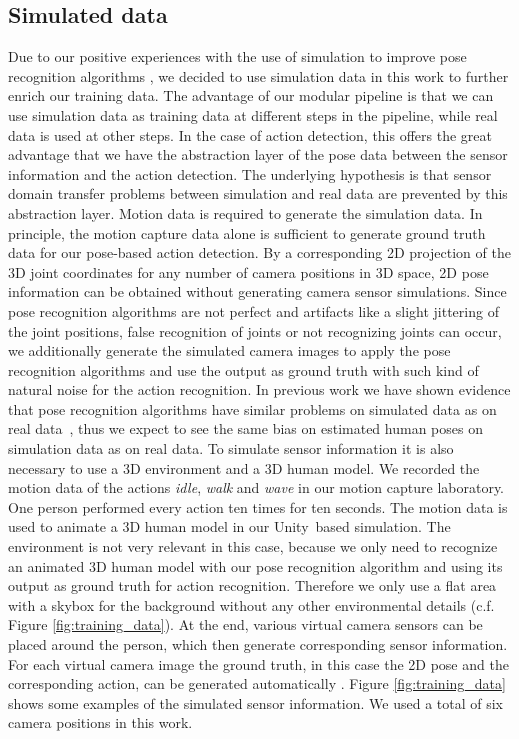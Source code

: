 \documentclass[a4paper, 10pt, conference]{ieeeconf}
\begin{document}
\subsection{Simulated data}
\label{sec:train_simulated}
Due to our positive experiences with the use of simulation to improve pose recognition algorithms \cite{ludlUsingSimulationImprove2018}, we decided to use simulation data in this work to further enrich our training data. The advantage of our modular pipeline is that we can use simulation data as training data at different steps in the pipeline, while real data is used at other steps. In the case of action detection, this offers the great advantage that we have the abstraction layer of the pose data between the sensor information and the action detection. The underlying hypothesis is that sensor domain transfer problems between simulation and real data are prevented by this abstraction layer. Motion data is required to generate the simulation data. In principle, the motion capture data alone is sufficient to generate ground truth data for our pose-based action detection. By a corresponding 2D projection of the 3D joint coordinates for any number of camera positions in 3D space, 2D pose information can be obtained without generating camera sensor simulations. Since pose recognition algorithms are not perfect and artifacts like a slight jittering of the joint positions, false recognition of joints or not recognizing joints can occur, we additionally generate the simulated camera images to apply the pose recognition algorithms and use the output as ground truth with such kind of natural noise for the action recognition. In previous work we have shown evidence that pose recognition algorithms have similar problems on simulated data as on real data~\cite{ludlUsingSimulationImprove2018}, thus we expect to see the same bias on estimated human poses on simulation data as on real data. To simulate sensor information it is also necessary to use a 3D environment and a 3D human model. We recorded the motion data of the actions \textit{idle}, \textit{walk} and \textit{wave} in our motion capture laboratory. One person performed every action ten times for ten seconds. The motion data is used to animate a 3D human model in our Unity\textregistered~based simulation. The environment is not very relevant in this case, because we only need to recognize an animated 3D human model with our pose recognition algorithm and using its output as ground truth for action recognition. Therefore we only use a flat area with a skybox for the background without any other environmental details (c.f. Figure \ref{fig:training_data}). At the end, various virtual camera sensors can be placed around the person, which then generate corresponding sensor information. For each virtual camera image the ground truth, in this case the 2D pose and the corresponding action, can be generated automatically \cite{ludlUsingSimulationImprove2018}. Figure \ref{fig:training_data} shows some examples of the simulated sensor information. We used a total of six camera positions in this work.
\end{document}
